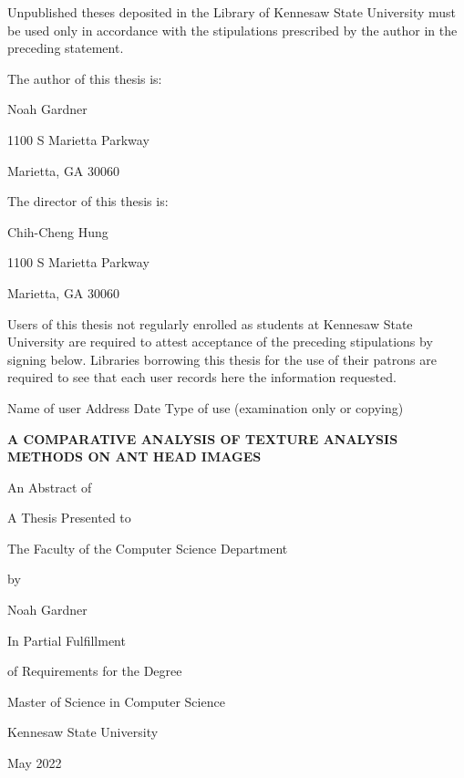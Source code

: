\documentclass[12pt]{article}
\newcommand{\thesistitle}{
    {\Large A comparative analysis of texture analysis methods on
ant head images}
}
\begin{document}
\noindent Unpublished theses deposited in the Library of Kennesaw State
University must be used only in accordance with the stipulations prescribed by
the author in the preceding statement.
\vspace{0.5in}

\noindent The author of this thesis is:
\begin{center}
    Noah Gardner

    1100 S Marietta Parkway

    Marietta, GA 30060
\end{center}

\noindent The director of this thesis is:
\begin{center}
    Chih-Cheng Hung

    1100 S Marietta Parkway

    Marietta, GA 30060
\end{center}
\vspace{0.5in}

\noindent Users of this thesis not regularly enrolled as students at Kennesaw
State University are required to attest acceptance of the preceding stipulations
by signing below. Libraries borrowing this thesis for the use of their patrons
are required to see that each user records here the information requested.
\vspace{0.3in}

\noindent
Name of user \hspace{0.2in} Address \hspace{0.2in} Date \hspace{0.2in} Type of
use (examination only or copying)
\newpage

\begin{center}
    \textbf{\MakeUppercase{\thesistitle}}
    \vspace{1in}

    An Abstract of

    A Thesis Presented to

    The Faculty of the Computer Science Department
    \vspace{1in}

    by
    \vspace{0.5in}

    Noah Gardner
    \vspace{1in}

    In Partial Fulfillment

    of Requirements for the Degree

    Master of Science in Computer Science

    \vspace{1in}
    Kennesaw State University

    May 2022
\end{center}
\newpage
\end{document}
